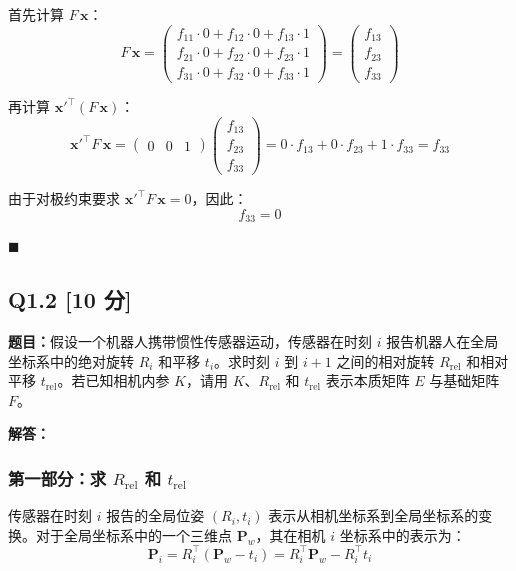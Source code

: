 \documentclass[12pt, a4paper]{article}
\begin{document}
首先计算 $F \, \mathbf{x}$：
\[
F \, \mathbf{x} =
\begin{pmatrix}
f_{11} \cdot 0 + f_{12} \cdot 0 + f_{13} \cdot 1 \\
f_{21} \cdot 0 + f_{22} \cdot 0 + f_{23} \cdot 1 \\
f_{31} \cdot 0 + f_{32} \cdot 0 + f_{33} \cdot 1
\end{pmatrix}
= \begin{pmatrix} f_{13} \\ f_{23} \\ f_{33} \end{pmatrix}
\]

再计算 $\mathbf{x}'^{\top} (F \, \mathbf{x})$：
\[
\mathbf{x}'^{\top} F \, \mathbf{x} =
\begin{pmatrix} 0 & 0 & 1 \end{pmatrix}
\begin{pmatrix} f_{13} \\ f_{23} \\ f_{33} \end{pmatrix}
= 0 \cdot f_{13} + 0 \cdot f_{23} + 1 \cdot f_{33} = f_{33}
\]

由于对极约束要求 $\mathbf{x}'^{\top} F \, \mathbf{x} = 0$，因此：
\[
\boxed{f_{33} = 0}
\]

\hfill $\blacksquare$

\newpage

\subsection*{Q1.2 [10 分]}

\textbf{题目：}假设一个机器人携带惯性传感器运动，传感器在时刻 $i$ 报告机器人在全局坐标系中的绝对旋转 $R_i$ 和平移 $t_i$。求时刻 $i$ 到 $i+1$ 之间的相对旋转 $R_{\text{rel}}$ 和相对平移 $t_{\text{rel}}$。若已知相机内参 $K$，请用 $K$、$R_{\text{rel}}$ 和 $t_{\text{rel}}$ 表示本质矩阵 $E$ 与基础矩阵 $F$。

\bigskip
\textbf{解答：}

\subsubsection*{第一部分：求 $R_{\text{rel}}$ 和 $t_{\text{rel}}$}

传感器在时刻 $i$ 报告的全局位姿 $(R_i, t_i)$ 表示从相机坐标系到全局坐标系的变换。对于全局坐标系中的一个三维点 $\mathbf{P}_w$，其在相机 $i$ 坐标系中的表示为：
\[
\mathbf{P}_i = R_i^{\top} (\mathbf{P}_w - t_i) = R_i^{\top} \mathbf{P}_w - R_i^{\top} t_i
\]
\end{document}
